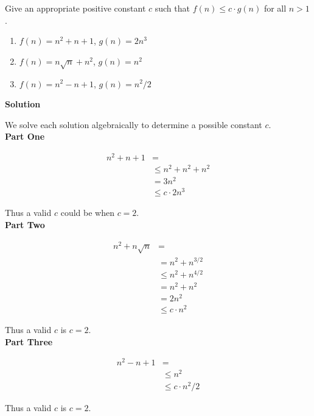 \documentclass[]{mo-assignment}
\begin{document}
    \maketitle
    \pagebreak

    \begin{problem}
        Give an appropriate positive constant \(c\) such that \(f(n) \leq c \cdot
        g(n)\) for all \(n > 1\).

        \begin{enumerate}
	    \item \(f(n) = n^2 + n + 1\), \(g(n) = 2n^3\)
	    \item \(f(n) = n\sqrt{n} + n^2\), \(g(n) = n^2\)
	    \item \(f(n) = n^2 - n + 1\), \(g(n) = n^2 / 2\)
        \end{enumerate}

        \textbf{Solution}

        We solve each solution algebraically to determine a possible constant
        \(c\).
        \\

        \textbf{Part One}

        \[
	    \begin{split}
	        n^2 + n + 1 &=
	        \\
	        &\leq n^2 + n^2 + n^2
	        \\
	        &= 3n^2
	        \\
	        &\leq c \cdot 2n^3
	    \end{split}
        \]

        Thus a valid \(c\) could be when \(c = 2\).
        \\

        \textbf{Part Two}

        \[
	    \begin{split}
	        n^2 + n\sqrt{n} &=
	        \\
	        &= n^2 + n^{3/2}
	        \\
	        &\leq n^2 + n^{4/2}
	        \\
	        &= n^2 + n^2
	        \\
	        &= 2n^2
	        \\
	        &\leq c \cdot n^2
	    \end{split}
        \]

        Thus a valid \(c\) is \(c = 2\).
        \\

        \textbf{Part Three}

        \[
	    \begin{split}
	        n^2 - n + 1 &=
	        \\
	        &\leq n^2
	        \\
	        &\leq c \cdot n^2/2
	    \end{split}
        \]

        Thus a valid \(c\) is \(c = 2\).

    \end{problem}
\end{document}
